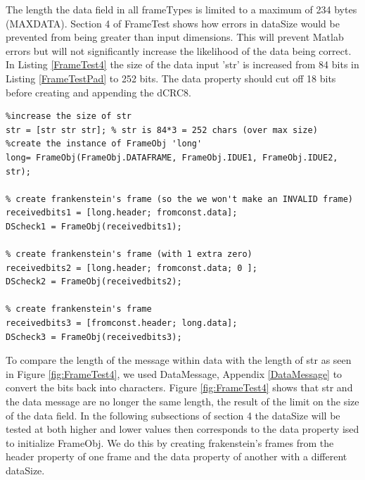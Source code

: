 The length the data field in all frameTypes is limited to a maximum of 234 bytes (MAXDATA). Section 4 of FrameTest shows how errors in dataSize would be prevented from being greater than input dimensions. This will prevent Matlab errors but will not significantly increase the likelihood of the data being correct. In Listing \ref{FrameTest4} the size of the data input 'str' is increased from 84 bits in Listing \ref{FrameTestPad} to 252 bits. The data property should cut off 18 bits before creating and appending the dCRC8.

\begin{lstlisting} 
%increase the size of str
str = [str str str]; % str is 84*3 = 252 chars (over max size)
%create the instance of FrameObj 'long'
long= FrameObj(FrameObj.DATAFRAME, FrameObj.IDUE1, FrameObj.IDUE2, str);

% create frankenstein's frame (so the we won't make an INVALID frame)
receivedbits1 = [long.header; fromconst.data];
DScheck1 = FrameObj(receivedbits1);

% create frankenstein's frame (with 1 extra zero)
receivedbits2 = [long.header; fromconst.data; 0 ];
DScheck2 = FrameObj(receivedbits2);

% create frankenstein's frame
receivedbits3 = [fromconst.header; long.data];
DScheck3 = FrameObj(receivedbits3);
\end{lstlisting} 

To compare the length of the message within data with the length of str as seen in Figure \ref{fig:FrameTest4}, we used DataMessage, Appendix \ref{DataMessage} to convert the bits back into characters.  Figure \ref{fig:FrameTest4} shows that str and the data message are no longer the same length, the result of the limit on the size of the data field. In the following subsections of section 4 the dataSize will be tested at both higher and lower values then corresponds to the data property ised to initialize FrameObj. We do this by creating frakenstein's frames from the header property of one frame and the data property of another with a different dataSize. 

